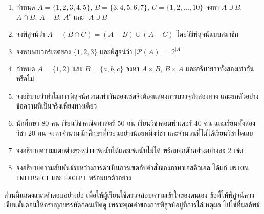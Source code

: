 \newpage
\QAChapter
\begin{enumerate}
    \item กำหนด $A = \{1, 2, 3, 4, 5\}$, $B = \{3, 4, 5, 6, 7\}$, $U = \{1, 2, \ldots, 10\}$ จงหา $A \cup B$, $A \cap B$, $A - B$, $A^c$ และ $|A \cup B|$
    \item จงพิสูจน์ว่า $A - (B \cap C) = (A - B) \cup (A - C)$ โดยวิธีพิสูจน์แบบสมาชิก
    \item จงหาเพาเวอร์เซตของ $\{1, 2, 3\}$ และพิสูจน์ว่า $|\mathcal{P}(A)| = 2^{|A|}$
    \item กำหนด $A = \{1, 2\}$ และ $B = \{a, b, c\}$ จงหา $A \times B$, $B \times A$ และอธิบายว่าทั้งสองเท่ากันหรือไม่
    \item จงอธิบายว่าทำไมการพิสูจน์ความเท่ากันของเซตจึงต้องแสดงการบรรจุทั้งสองทาง และยกตัวอย่างข้อความที่เป็นจริงเพียงทางเดียว
    \item นักศึกษา 80 คน เรียนวิชาคณิตศาสตร์ 50 คน เรียนวิชาคอมพิวเตอร์ 40 คน และเรียนทั้งสองวิชา 20 คน จงหาจำนวนนักศึกษาที่เรียนอย่างน้อยหนึ่งวิชา และจำนวนที่ไม่ได้เรียนวิชาใดเลย
    \item จงอธิบายความแตกต่างระหว่างเซตนับได้และเซตนับไม่ได้ พร้อมยกตัวอย่างอย่างละ 2 เซต
    \item จงอธิบายความสัมพันธ์ระหว่างการดำเนินการเซตกับคำสั่งของภาษาเอสคิวเอล ได้แก่ \texttt{UNION}, \texttt{INTERSECT} และ \texttt{EXCEPT} พร้อมยกตัวอย่าง
\end{enumerate}

ส่วนนี้แสดงแนวคำตอบอย่างย่อ เพื่อให้ผู้เรียนใช้ตรวจสอบความเข้าใจของตนเอง ข้อที่ให้พิสูจน์ควรเขียนขั้นตอนให้ครบทุกบรรทัดก่อนเปิดดู เพราะคุณค่าของการพิสูจน์อยู่ที่การไล่เหตุผล ไม่ใช่ที่ผลลัพธ์

